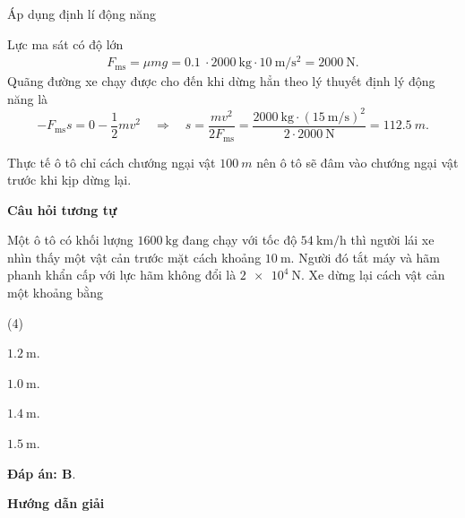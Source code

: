 \begin{dang}{Áp dụng định lí động năng}
{		Lực ma sát có độ lớn 
		\begin{align*}
			F_\text{ms}=\mu mg=\SI{0.1}{}\cdot\SI{2000}{\kilogram}\cdot\SI{10}{\meter/\second^2}=\SI{2000}{\newton}.
		\end{align*}
		Quãng đường xe chạy được cho đến khi dừng hẳn theo lý thuyết định lý động năng là
		$$-F_\text{ms}s = 0 - \dfrac{1}{2}mv^2 \quad\Rightarrow\quad s = \dfrac{mv^2}{2F_\text{ms}}=\dfrac{\SI{2000}{\kilogram}\cdot(\SI{15}{\meter/\second})^2}{2\cdot\SI{2000}{\newton}}=\SI{112.5}{m}.$$
		
		Thực tế ô tô chỉ cách chướng ngại vật $\SI{100}{m}$ nên ô tô sẽ đâm vào chướng ngại vật trước khi kịp dừng lại.
		
		\begin{center}
			\textbf{Câu hỏi tương tự}
		\end{center}
		
		Một ô tô có khối lượng $\SI{1600}{\kilogram}$ đang chạy với tốc độ $\SI{54}{\kilo\meter/\hour}$ thì người lái xe nhìn thấy một vật cản trước mặt cách khoảng $\SI{10}{\meter}$. Người đó tắt máy và hãm phanh khẩn cấp với lực hãm không đổi là $\SI{2e4}{\newton}$. Xe dừng lại cách vật cản một khoảng bằng
		\begin{mcq}(4)
			\item $\SI{1,2}{\meter}$.
			\item $\SI{1,0}{\meter}$.
			\item $\SI{1,4}{\meter}$.
			\item $\SI{1,5}{\meter}$.
		\end{mcq}
		
		\textbf{Đáp án: B}.
	}
	{\begin{center}
			\textbf{Hướng dẫn giải}
		\end{center}
		
}
\end{dang}

